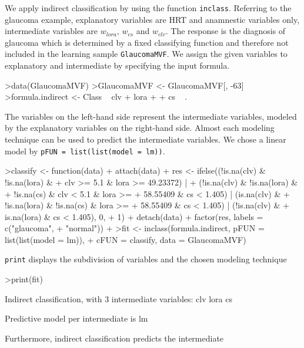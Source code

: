 \documentclass[11pt]{article}
\begin{document}
We apply indirect classification by using the function \texttt{inclass}.
Referring to the glaucoma example, explanatory variables are HRT 
and anamnestic variables only, intermediate variables 
are $w_{lora}, \, w_{cs}$ and $w_{clv}$. The response is the 
diagnosis of glaucoma which is determined by a fixed classifying 
function and therefore not included in the learning 
sample \texttt{GlaucomaMVF}. We assign the given variables to explanatory 
and intermediate by specifying the input formula.
\begin{Schunk}
\begin{Sinput}
>data(GlaucomaMVF)
>GlaucomaMVF <- GlaucomaMVF[, -63]
>formula.indirect <- Class ~ clv + lora + 
+     cs ~ .
\end{Sinput}
\end{Schunk}
The variables on the left-hand side represent the intermediate variables, 
modeled by the explanatory variables on the right-hand side. Almost each 
modeling technique can be used to predict the intermediate variables. We 
chose a linear model by \texttt{pFUN = list(list(model = lm))}.
\begin{Schunk}
\begin{Sinput}
>classify <- function(data) {
+     attach(data)
+     res <- ifelse((!is.na(clv) & !is.na(lora) & 
+         clv >= 5.1 & lora >= 49.23372) | 
+         (!is.na(clv) & !is.na(lora) & 
+             !is.na(cs) & clv < 5.1 & lora >= 
+             58.55409 & cs < 1.405) | (is.na(clv) & 
+         !is.na(lora) & !is.na(cs) & lora >= 
+         58.55409 & cs < 1.405) | (!is.na(clv) & 
+         is.na(lora) & cs < 1.405), 0, 
+         1)
+     detach(data)
+     factor(res, labels = c("glaucoma", 
+         "normal"))
+ }
>fit <- inclass(formula.indirect, pFUN = list(list(model = lm)), 
+     cFUN = classify, data = GlaucomaMVF)
\end{Sinput}
\end{Schunk}
\texttt{print} displays the subdivision of variables and the chosen 
modeling technique
\begin{Schunk}
\begin{Sinput}
>print(fit)
\end{Sinput}
\begin{Soutput}
 Indirect classification, with 3 intermediate variables: 
 clv lora cs 
 
 Predictive model per intermediate is lm 
\end{Soutput}
\end{Schunk}
Furthermore, indirect classification predicts the intermediate 
\end{document}
